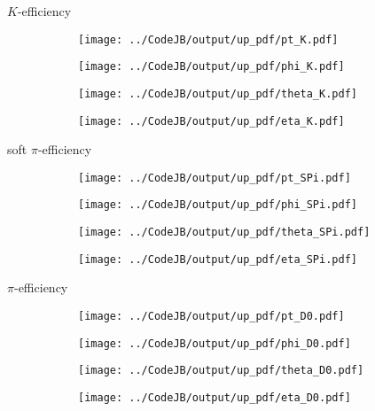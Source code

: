 \documentclass[11pt]{beamer}
\begin{document}
\begin{frame}{$K$-efficiency}
\begin{figure}
\begin{subfigure}{0.45\textwidth}
\texttt{[image: ../CodeJB/output/up\_pdf/pt\_K.pdf]}
\end{subfigure}
\begin{subfigure}{0.45\textwidth}
\texttt{[image: ../CodeJB/output/up\_pdf/phi\_K.pdf]}
\end{subfigure}
\begin{subfigure}{0.45\textwidth}
\texttt{[image: ../CodeJB/output/up\_pdf/theta\_K.pdf]}
\end{subfigure}
\begin{subfigure}{0.45\textwidth}
\texttt{[image: ../CodeJB/output/up\_pdf/eta\_K.pdf]}
\end{subfigure}
\end{figure}
\end{frame}
\begin{frame}{soft $\pi$-efficiency}
\begin{figure}
\begin{subfigure}{0.45\textwidth}
\texttt{[image: ../CodeJB/output/up\_pdf/pt\_SPi.pdf]}
\end{subfigure}
\begin{subfigure}{0.45\textwidth}
\texttt{[image: ../CodeJB/output/up\_pdf/phi\_SPi.pdf]}
\end{subfigure}
\begin{subfigure}{0.45\textwidth}
\texttt{[image: ../CodeJB/output/up\_pdf/theta\_SPi.pdf]}
\end{subfigure}
\begin{subfigure}{0.45\textwidth}
\texttt{[image: ../CodeJB/output/up\_pdf/eta\_SPi.pdf]}
\end{subfigure}
\end{figure}
\end{frame}
\begin{frame}{$\pi$-efficiency}
\begin{figure}
\begin{subfigure}{0.45\textwidth}
\texttt{[image: ../CodeJB/output/up\_pdf/pt\_D0.pdf]}
\end{subfigure}
\begin{subfigure}{0.45\textwidth}
\texttt{[image: ../CodeJB/output/up\_pdf/phi\_D0.pdf]}
\end{subfigure}
\begin{subfigure}{0.45\textwidth}
\texttt{[image: ../CodeJB/output/up\_pdf/theta\_D0.pdf]}
\end{subfigure}
\begin{subfigure}{0.45\textwidth}
\texttt{[image: ../CodeJB/output/up\_pdf/eta\_D0.pdf]}
\end{subfigure}
\end{figure}
\end{frame}
\end{document}
